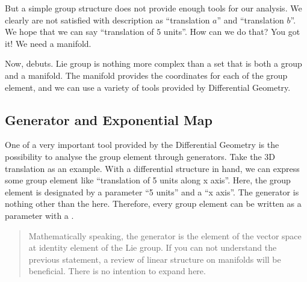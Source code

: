 \documentclass[letterpaper,10pt,english]{sphinxmanual}
\begin{document}
But a simple group structure does not provide enough tools for our analysis. We clearly are not satisfied with description as ``translation \(a\)” and ``translation \(b\)”. We hope that we can say ``translation of \(5\) units''. How can we do that? You got it! We need a manifold.

Now,  debuts. Lie group is nothing more complex than a set that is both a group and a manifold. The manifold provides the coordinates for each of the group element, and we can use a variety of tools provided by Differential Geometry.


\subsection{Generator and Exponential Map}
\label{\detokenize{bg_liegp:generator-and-exponential-map}}
One of a very important tool provided by the Differential Geometry is the possibility to analyse the group element through generators. Take the 3D translation as an example. With a differential structure in hand, we can express some group element like ``translation of 5 units along x axis''. Here, the group element is designated by a parameter ``5 units'' and a  ``x axis''. The generator is nothing other than the  here. Therefore, every group element can be written as a parameter with a .
\begin{quote}

Mathematically speaking, the generator is the element of the vector space at identity element of the Lie group. If you can not understand the previous statement, a review of linear structure on manifolds will be beneficial. There is no intention to expand here.
\end{quote}
\end{document}

